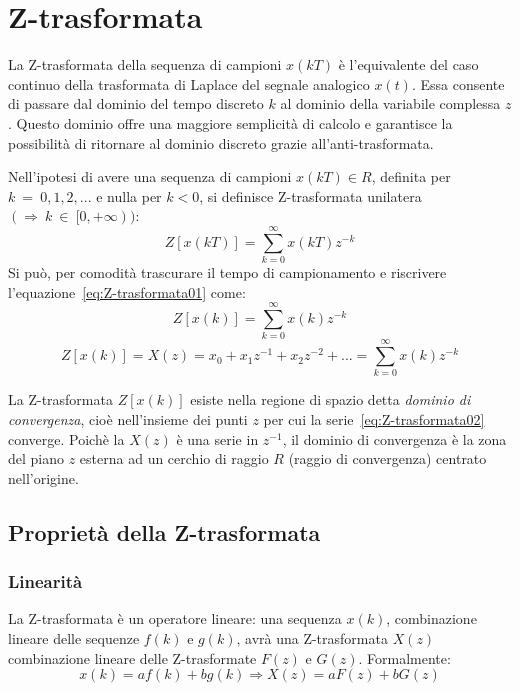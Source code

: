 \documentclass[a4paper]{report}
\begin{document}
\chapter{Z-trasformata}
La Z-trasformata della sequenza di campioni $x(kT)$ \`e l'equivalente
del caso continuo della trasformata di Laplace del segnale analogico
$x(t)$. Essa consente di passare dal dominio del tempo discreto $k$ al
dominio della variabile complessa $z$. Questo dominio offre una
maggiore semplicit\`a di calcolo e garantisce la possibilit\`a di
ritornare al dominio discreto grazie all'anti-trasformata.

Nell'ipotesi di avere una sequenza di campioni $x(kT) \in R$, definita
per $k~=~0, 1, 2, ...$ e nulla per $k < 0$, si definisce
Z-trasformata unilatera\\ $( \Rightarrow~k~\in~[0, + \infty))$:
\begin{equation}\label{eq:Z-trasformata01}
  Z[x(kT)] = \sum\limits_{k=0}^{\infty} x(kT) z^{-k}
\end{equation}
Si pu\`o, per comodit\`a trascurare il tempo di campionamento e
riscrivere l'equazione~\ref{eq:Z-trasformata01} come:
\begin{equation}\label{eq:Z-trasformata02}
  Z[x(k)] = \sum\limits_{k=0}^{\infty} x(k) z^{-k}
\end{equation}
\[
Z[x(k)] = X(z) = x_0 + x_1z^{-1} + x_2 z^{-2} + ... =
\sum\limits_{k=0}^{\infty} x(k) z^{-k} 
\]

La Z-trasformata $Z[x(k)]$ esiste nella regione di spazio detta {\em
  dominio di convergenza}, cio\`e
nell'insieme dei punti $z$ per cui la serie~\ref{eq:Z-trasformata02}
converge. Poich\`e la $X(z)$ \`e una serie in $z^{-1}$, il dominio di
convergenza \`e la zona del piano $z$ esterna ad un cerchio di raggio
$R$ (raggio di convergenza) centrato
nell'origine. 

\section{Propriet\`a della Z-trasformata}
\subsection{Linearit\`a}
La Z-trasformata \`e un operatore lineare: una sequenza $x(k)$,
combinazione lineare delle sequenze $f(k)$ e $g(k)$, avr\`a una
Z-trasformata $X(z)$ combinazione lineare delle Z-trasformate $F(z)$ e
$G(z)$. Formalmente:
  \[
   x(k) = af(k) + bg(k) \Rightarrow X(z) = aF(z) + bG(z)
  \]
  
\end{document}
